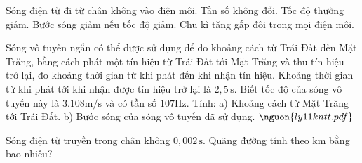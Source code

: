 \begin{ex}
Sóng điện từ đi từ chân không vào điện môi.
\choiceTF
{\True Tần số không đổi.}
{\True Tốc độ thường giảm.}
{\True Bước sóng giảm nếu tốc độ giảm.}
{Chu kì tăng gấp đôi trong mọi điện môi.}
\end{ex}

\begin{ex}
Sóng vô tuyến ngắn có thể được sử dụng để đo khoảng cách từ Trái Đất đến Mặt Trăng, bằng cách phát một tín hiệu từ Trái Đất tới Mặt Trăng và thu tín hiệu trở lại, đo khoảng thời gian từ khi phát đến khi nhận tín hiệu. Khoảng thời gian từ khi phát tới khi nhận được tín hiệu trở lại là $2,5\,\mathrm{s}$. Biết tốc độ của sóng vô tuyến này là $3.108 \mathrm{m/s}$ và có tần số $107 \mathrm{Hz}$. Tính: a) Khoảng cách từ Mặt Trăng tới Trái Đất. b) Bước sóng của sóng vô tuyến đã sử dụng. $\nguon{ly11 kntt.pdf}$
\choiceTF

\end{ex}

\begin{ex}
Sóng điện từ truyền trong chân không $0,002\,\text{s}$. Quãng đường tính theo km bằng bao nhiêu?
\end{ex}

